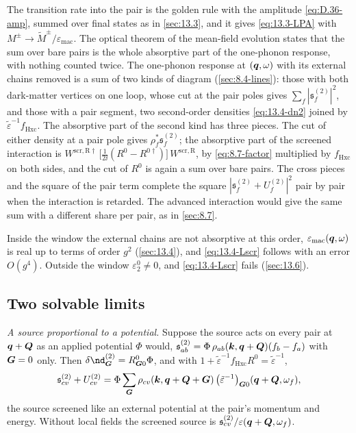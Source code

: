 The transition rate into the pair is the golden rule with the amplitude \cref{eq:D.36-amp}, summed over final states as in \cref{sec:13.3}, and it gives \cref{eq:13.3-LPA} with $M^\pm \to \tilde M^\pm/\varepsilon_{\mathrm{mac}}$. The optical theorem of the mean-field evolution states that the sum over bare pairs is the whole absorptive part of the one-phonon response, with nothing counted twice. The one-phonon response at $(\bm{q},\omega)$ with its external chains removed is a sum of two kinds of diagram (\cref{sec:8.4-lines}): those with both dark-matter vertices on one loop, whose cut at the pair poles gives $\sum_f|\mathfrak{s}^{(2)}_f|^2$, and those with a pair segment, two second-order densities \cref{eq:13.4-dn2} joined by $\tilde\varepsilon^{-1}f_{\mathrm{Hxc}}$. The absorptive part of the second kind has three pieces. The cut of either density at a pair pole gives $\rho_f^*\mathfrak{s}^{(2)}_f$; the absorptive part of the screened interaction is $W^{\mathrm{scr,R}\dagger}\,\bigl[\tfrac{1}{2\ii}(R^0 - R^{0\dagger})\bigr]\,W^{\mathrm{scr,R}}$, by \cref{eq:8.7-factor} multiplied by $f_{\mathrm{Hxc}}$ on both sides, and the cut of $R^0$ is again a sum over bare pairs. The cross pieces and the square of the pair term complete the square $|\mathfrak{s}^{(2)}_f + U^{(2)}_f|^2$ pair by pair when the interaction is retarded. The advanced interaction would give the same sum with a different share per pair, as in \cref{sec:8.7}.

Inside the window the external chains are not absorptive at this order, $\varepsilon_{\mathrm{mac}}(\bm{q},\omega)$ is real up to terms of order $g^2$ (\cref{sec:13.4}), and \cref{eq:13.4-Lscr} follows with an error $O(g^4)$. Outside the window $\varepsilon_2^0 \ne 0$, and \cref{eq:13.4-Lscr} fails (\cref{sec:13.6}).

\subsection*{Two solvable limits}

\emph{A source proportional to a potential.} Suppose the source acts on every pair at $\bm{q} + \bm{Q}$ as an applied potential $\Phi$ would, $\mathfrak{s}^{(2)}_{ab} = \Phi\,\rho_{ab}(\bm{k},\bm{q}+\bm{Q})(f_b - f_a)$ with $\bm{G} = 0$ only. Then $\delta\nd^{(2)}_{\vect{G}} = R^0_{\vect{G}0}\Phi$, and with $1 + \tilde\varepsilon^{-1}f_{\mathrm{Hxc}}R^0 = \tilde\varepsilon^{-1}$,
\begin{equation*}
  \mathfrak{s}^{(2)}_{cv} + U^{(2)}_{cv} = \Phi\sum_{\bm{G}}\rho_{cv}(\bm{k},\bm{q}+\bm{Q}+\bm{G})\,\bigl(\tilde\varepsilon^{-1}\bigr)_{\bm{G}0}(\bm{q}+\bm{Q},\omega_f) ,
\end{equation*}
the source screened like an external potential at the pair's momentum and energy. Without local fields the screened source is $\mathfrak{s}^{(2)}_{cv}/\varepsilon(\bm{q}+\bm{Q},\omega_f)$.

